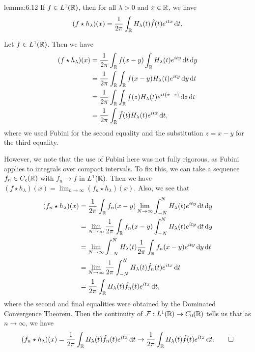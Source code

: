 \begin{lemma}{lemma:6.12}
    If $f \in L^1(\mathbb{R})$, then for all $\lambda > 0$ and $x \in \mathbb{R}$, we have 
    \[ (f \star h_\lambda)(x) = \frac{1}{2\pi} \int_{\mathbb{R}} H_\lambda(t) 
    \hat f(t) e^{itx}\,\mathrm{d} t. \] 
\end{lemma}
\begin{pf}
    Let $f \in L^1(\mathbb{R})$. Then we have 
    \begin{align*}
        (f \star h_\lambda)(x) 
        &= \frac{1}{2\pi} \int_{\mathbb{R}} f(x-y) \int_{\mathbb{R}} H_\lambda(t) e^{ity} \,\mathrm{d} t \,\mathrm{d} y \\ 
        &= \frac{1}{2\pi} \int_{\mathbb{R}} \int_{\mathbb{R}} f(x-y) H_\lambda(t) e^{ity} \,\mathrm{d} y \,\mathrm{d} t \\ 
        &= \frac{1}{2\pi} \int_{\mathbb{R}} \int_{\mathbb{R}} f(z) H_\lambda(t) e^{it(x-z)} \,\mathrm{d} z \,\mathrm{d} t \\ 
        &= \frac{1}{2\pi} \int_{\mathbb{R}} \hat f(t) H_\lambda(t) e^{itx} \,\mathrm{d} t, 
    \end{align*}
    where we used Fubini for the second equality and the substitution 
    $z = x - y$ for the third equality. 
    
    \newpage 
    However, we note that the use of Fubini here was not fully rigorous, 
    as Fubini applies to integrals over compact intervals. To fix this, 
    we can take a sequence $f_n \in C_c(\mathbb{R})$ with $f_n \to f$ in $L^1(\mathbb{R})$. 
    Then we have $(f \star h_\lambda)(x) = \lim_{n\to\infty} (f_n \star 
    h_\lambda)(x)$. Also, we see that 
    \begin{align*}
        (f_n \star h_\lambda)(x) 
        &= \frac{1}{2\pi} \int_{\mathbb{R}} f_n(x-y) \lim_{N\to\infty} \int_{-N}^N H_\lambda(t) e^{ity} \,\mathrm{d} t \,\mathrm{d} y \\ 
        &= \lim_{N\to\infty} \frac{1}{2\pi} \int_{\mathbb{R}} f_n(x-y) \int_{-N}^N H_\lambda(t) e^{ity} \,\mathrm{d} t \,\mathrm{d} y \\
        &= \lim_{N\to\infty} \int_{-N}^N H_\lambda(t) \frac{1}{2\pi} \int_{\mathbb{R}} f_n(x-y) e^{ity} \,\mathrm{d} y \,\mathrm{d} t \\ 
        &= \lim_{N\to\infty} \frac{1}{2\pi} \int_{-N}^N H_\lambda(t) \hat f_n(t) e^{itx} \,\mathrm{d} t \\ 
        &= \frac{1}{2\pi} \int_{\mathbb{R}} H_\lambda(t) \hat f_n(t) e^{itx} \,\mathrm{d} t,
    \end{align*}
    where the second and final equalities were obtained by the Dominated Convergence 
    Theorem. Then the continuity of ${\cal F} : L^1(\mathbb{R}) \to C_0(\mathbb{R})$ tells us that 
    as $n \to \infty$, we have 
    \[ (f_n \star h_\lambda)(x) 
    = \frac{1}{2\pi} \int_{\mathbb{R}} H_\lambda(t) \hat f_n(t) e^{itx} \,\mathrm{d} t
    \to \frac{1}{2\pi} \int_{\mathbb{R}} H_\lambda(t) \hat f(t) e^{itx} \,\mathrm{d} t. \qedhere \] 
\end{pf}

